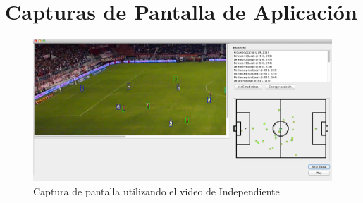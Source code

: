 \newpage
\appendix
\chapter{Capturas de Pantalla de Aplicación}

\begin{figure}[H]
  \centering
  \includegraphics[width=\linewidth]{./images/Screen-Indep.png}
  \caption{Captura de pantalla utilizando el video de Independiente}
\end{figure}
